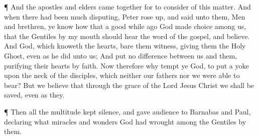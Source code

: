  ¶ And the apostles and elders came together for to consider
of this matter.  And when there had been much disputing,
Peter rose up, and said unto them, Men and brethren, ye know how that a
good while ago God made choice among us, that the Gentiles by my mouth
should hear the word of the gospel, and believe.  And God,
which knoweth the hearts, bare them witness, giving them the Holy Ghost,
even as he did unto us;  And put no difference between us
and them, purifying their hearts by faith.  Now therefore
why tempt ye God, to put a yoke upon the neck of the disciples, which
neither our fathers nor we were able to bear?  But we
believe that through the grace of the Lord Jesus Christ we shall be
saved, even as they.

 ¶ Then all the multitude kept silence, and gave audience
to Barnabas and Paul, declaring what miracles and wonders God had
wrought among the Gentiles by them.


